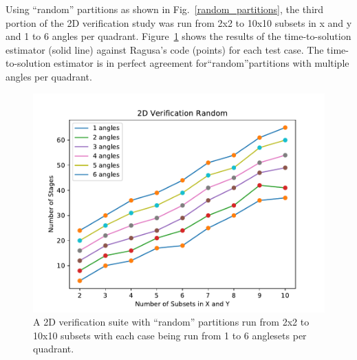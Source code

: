 \documentclass[times,final]{elsarticle}
\begin{document}
Using ``random'' partitions as shown in Fig.~\ref{random_partitions}, the third portion of the 2D verification study was run from 2x2 to 10x10 subsets in x and y and 1 to 6 angles per quadrant.  Figure~\ref{random_verification} shows the results of the time-to-solution estimator (solid line) against Ragusa's code (points) for each test case. The time-to-solution estimator is in perfect agreement for``random''partitions with multiple angles per quadrant.

\begin{figure}[H]
\centering
\includegraphics[scale=0.8]{../figures/random_verification.pdf}
\caption{A 2D verification suite with ``random'' partitions run from 2x2 to 10x10 subsets with each case being run from 1 to 6 anglesets per quadrant.}
\label{random_verification}
\end{figure}

\end{document}

